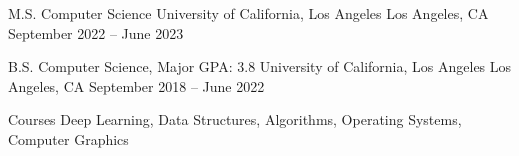 \documentclass[12pt, letterpaper]{awesome-cv}
\begin{document}
\makecvheader


\begin{cventries}
  \cventry
    {M.S. Computer Science} %
    {University of California, Los Angeles} %
    {Los Angeles, CA} %
    {September 2022 -- June 2023} %
    {
    }

  \cventry
    {B.S. Computer Science, Major GPA: 3.8} %
    {University of California, Los Angeles} %
    {Los Angeles, CA} %
    {September 2018 -- June 2022} %
    {
      \vspace{-0.11in}
      \begin{cvskills}
        \cvskill
          {Courses} %
          {Deep Learning, Data Structures, Algorithms, Operating Systems, Computer Graphics} %
      \end{cvskills}
    }
  \vspace{-0.2in}
\end{cventries}
\end{document}
